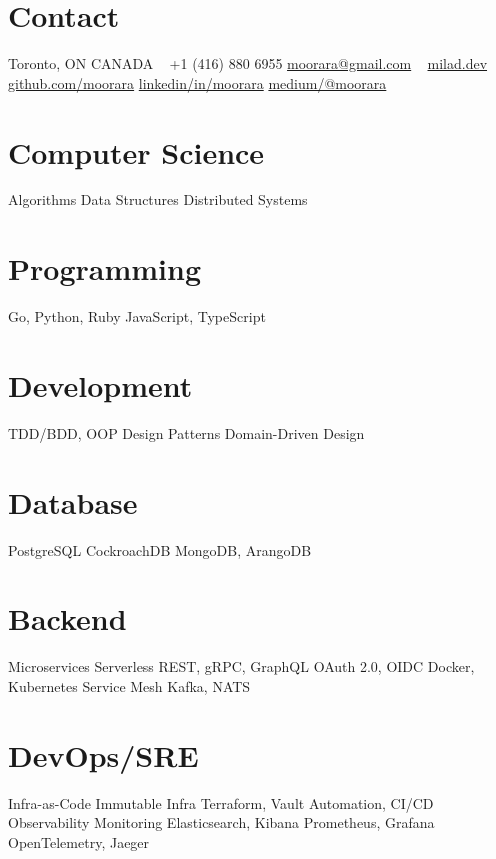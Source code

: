 \documentclass[]{cv-style}                     %
\begin{document}
\lastupdated



\begin{aside}
%
\section{Contact}
Toronto, ON  CANADA
~
+1 (416) 880 6955
\href{mailto:moorara@gmail.com}{moorara@gmail.com}
~
\href{https://milad.dev}{milad.dev}
\href{https://github.com/moorara}{github.com/moorara}
\href{https://linkedin.com/in/moorara}{linkedin/in/moorara}
\href{https://medium.com/@moorara}{medium/@moorara}
%
\section{Computer Science}
Algorithms
Data Structures
Distributed Systems
%
\section{Programming}
Go, Python, Ruby
JavaScript, TypeScript
%
\section{Development}
TDD/BDD, OOP
Design Patterns
Domain-Driven Design
%
\section{Database}
PostgreSQL
CockroachDB
MongoDB, ArangoDB
%
\section{Backend}
Microservices
Serverless
REST, gRPC, GraphQL
OAuth 2.0, OIDC
Docker, Kubernetes
Service Mesh
Kafka, NATS
%
%
\section{DevOps/SRE}
Infra-as-Code
Immutable Infra
Terraform, Vault
Automation, CI/CD
Observability
Monitoring
Elasticsearch, Kibana
Prometheus, Grafana
OpenTelemetry, Jaeger
%

\end{aside}
\end{document}
